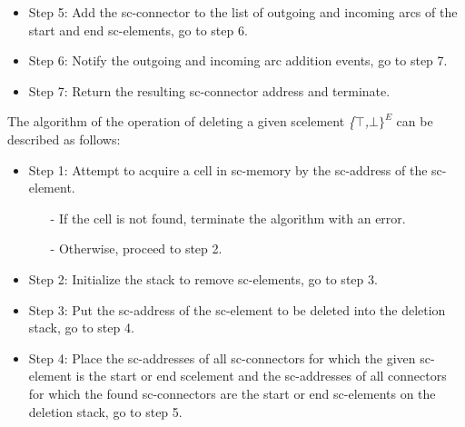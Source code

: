 \documentclass{article}
\begin{document}
\begin{multicols}{2}
\begin{itemize}
\itemsep=0mm
\item Step 5: Add the sc-connector to the list of outgoing
and incoming arcs of the start and end sc-elements,
go to step 6.
\end{itemize}

\begin{itemize}
\itemsep=0mm
\item Step 6: Notify the outgoing and incoming arc addition events, go to step 7.
\end{itemize}

\begin{itemize}
\itemsep = 0mm
\item Step 7: Return the resulting sc-connector address
and terminate.
\end{itemize}
The algorithm of the operation of deleting a given scelement \textit{\{$\top$\textit{,}$\bot$\textit{$\}^E$}} can be described as follows:

\begin{itemize}
\itemsep=0mm
\item Step 1: Attempt to acquire a cell in sc-memory by
the sc-address of the sc-element.


\begin{itemize}
\itemsep=0mm
\item[-] If the cell is not found, terminate the algorithm
with an error.

\item[-]Otherwise, proceed to step 2.
\end{itemize}
\end{itemize}

\begin{itemize}
\itemsep = 0mm
\item Step 2: Initialize the stack to remove sc-elements,
go to step 3.
\end{itemize}

\begin{itemize}
\itemsep = 0mm
\item Step 3: Put the sc-address of the sc-element to be
deleted into the deletion stack, go to step 4.

\end{itemize}

\begin{itemize}
\itemsep = 0mm
\item Step 4: Place the sc-addresses of all sc-connectors
for which the given sc-element is the start or end scelement and the sc-addresses of all connectors for
which the found sc-connectors are the start or end
sc-elements on the deletion stack, go to step 5.
\end{itemize}


\end{multicols}
\end{document}
